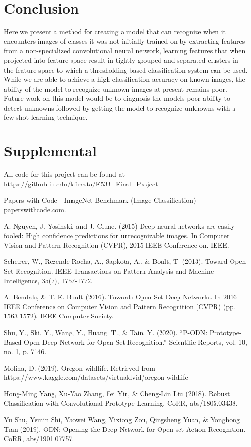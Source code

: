 \documentclass[conference]{IEEEtran}
\begin{document}
\section{Conclusion}

Here we present a method for creating a model that can recognize when it encounters images of classes it was not initially trained on by extracting features from a non-specialized convolutional neural network, learning features that when projected into feature space result in tightly grouped and separated clusters in the feature space to which a thresholding based classification system can be used. While we are able to achieve a high classification accuracy on known images, the ability of the model to recognize unknown images at present remains poor. Future work on this model would be to diagnosis the models poor ability to detect unknowns followed by getting the model to recognize unknowns with a few-shot learning technique.

\section{Supplemental}

All code for this project can be found at https://github.iu.edu/kfiresto/E533\_Final\_Project

\begin{thebibliography}{00}
 Papers with Code - ImageNet Benchmark (Image Classification) –- paperswithcode.com.

 A. Nguyen, J. Yosinski, and J. Clune. (2015) Deep neural networks are easily fooled: High confidence predictions for unrecognizable images. In Computer Vision and Pattern Recognition (CVPR), 2015 IEEE Conference on. IEEE.

 Scheirer, W., Rezende Rocha, A., Sapkota, A., \& Boult, T. (2013). Toward Open Set Recognition. IEEE Transactions on Pattern Analysis and Machine Intelligence, 35(7), 1757-1772.

 A. Bendale, \& T. E. Boult (2016). Towards Open Set Deep Networks. In 2016 IEEE Conference on Computer Vision and Pattern Recognition (CVPR) (pp. 1563-1572). IEEE Computer Society.

 Shu, Y., Shi, Y., Wang, Y., Huang, T., \& Tain, Y. (2020). “P-ODN: Prototype-Based Open Deep Network for Open Set Recognition.” Scientific Reports, vol. 10, no. 1,  p. 7146.

 Molina, D. (2019). Oregon wildlife. Retrieved from https://www.kaggle.com/datasets/virtualdvid/oregon-wildlife

 Hong-Ming Yang, Xu-Yao Zhang, Fei Yin, \& Cheng-Lin Liu (2018). Robust Classification with Convolutional Prototype Learning. CoRR, abs/1805.03438.

 Yu Shu, Yemin Shi, Yaowei Wang, Yixiong Zou, Qingsheng Yuan, \& Yonghong Tian (2019). ODN: Opening the Deep Network for Open-set Action Recognition. CoRR, abs/1901.07757.

\end{thebibliography}
\end{document}
